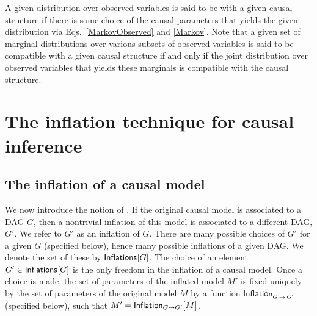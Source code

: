 A given distribution over observed variables is said to be  with a given causal structure if there is some choice of the causal parameters that yields the given distribution via Eqs.~\eqref{MarkovObserved} and \eqref{Markov}.  Note that a given set of marginal distributions over various subsets of observed variables is said to be compatible with a given causal structure if and only if the joint distribution over observed variables that yields these marginals is compatible with the causal structure.


\section{The inflation technique for causal inference}

\subsection{The inflation of a causal model}

We now introduce the notion of .  %
If the original causal model is associated to a DAG $G$, then a nontrivial inflation of this model is associated to a different DAG, $G'$.  
We refer to $G'$ as an inflation of $G$.  There are many possible choices of $G'$ for a given $G$ (specified below), hence many possible inflations of a given DAG.  We denote the set of these by $\SmallNamedFunction{Inflations}{G}$.   The choice of an element $G'\in \SmallNamedFunction{Inflations}{G}$ is the only freedom in the inflation of a causal model.  Once a choice is made, the set of parameters of the inflated model $M'$ is fixed uniquely by the set of parameters of the original model $M$ by a function $\mathsf{Inflation}_{G\to G'}$ (specified below), such that $M' = \SmallNamedFunction[G\to G']{Inflation}{M}$.

